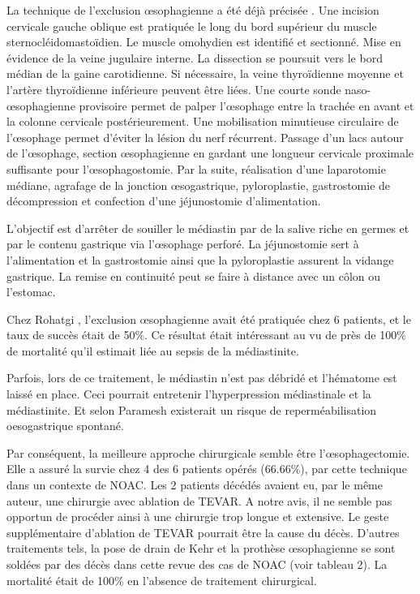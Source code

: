 \documentclass[./tfe.tex]{subfiles}
\begin{document}
La technique de l’exclusion œsophagienne a été déjà précisée \cite{rohatgi_role_2009}. Une incision cervicale gauche oblique est pratiquée le long du bord supérieur du muscle sternocléidomastoïdien. Le muscle omohydien est identifié et sectionné. Mise en évidence de la veine jugulaire interne. La dissection se poursuit vers le bord médian de la gaine carotidienne. Si nécessaire, la veine thyroïdienne moyenne et l’artère thyroïdienne inférieure peuvent être liées. Une courte sonde naso-œsophagienne provisoire permet de palper l’œsophage entre la trachée en avant et la colonne cervicale postérieurement. Une mobilisation minutieuse circulaire de l’œsophage permet d’éviter la lésion du nerf récurrent. Passage d’un lacs autour de l’œsophage, section œsophagienne en gardant une longueur cervicale proximale suffisante pour l’œsophagostomie. Par la suite, réalisation d’une laparotomie médiane, agrafage de la jonction œsogastrique, pyloroplastie, gastrostomie de décompression et confection d’une jéjunostomie d’alimentation.

L’objectif est d’arrêter de souiller le médiastin par de la salive riche en germes et par le contenu gastrique via l’œsophage perforé. La jéjunostomie sert à l’alimentation et la gastrostomie ainsi que la pyloroplastie assurent la vidange gastrique. La remise en continuité peut se faire à distance avec un côlon ou l’estomac.

Chez Rohatgi \cite{rohatgi_role_2009}, l’exclusion œsophagienne avait été pratiquée chez 6 patients, et le taux de succès était de 50\%. Ce résultat était intéressant au vu de près de 100\% de mortalité qu’il estimait liée au sepsis de la médiastinite.

Parfois, lors de ce traitement, le médiastin n’est pas débridé et l’hématome est laissé en place. Ceci pourrait entretenir l’hyperpression médiastinale et la médiastinite. Et selon Paramesh \cite{paramesh_spontaneous_1995} existerait un risque de reperméabilisation oesogastrique spontané.

Par conséquent, la meilleure approche chirurgicale semble être l’œsophagectomie. Elle a assuré la survie chez 4 des 6 patients opérés (66.66\%), par cette technique dans un contexte de NOAC. Les 2 patients décédés avaient eu, par le même auteur, une chirurgie avec ablation de TEVAR. A notre avis, il ne semble pas opportun de procéder ainsi à une chirurgie trop longue et extensive. Le geste supplémentaire d’ablation de TEVAR pourrait être la cause du décès.
D’autres traitements tels, la pose de drain de Kehr et la prothèse œsophagienne se sont soldées par des décès dans cette revue des cas de NOAC (voir tableau 2). La mortalité était de 100\% en l’absence de traitement chirurgical.
\end{document}
